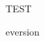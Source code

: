 \documentclass{ltxdoc}
\begin{document}
\maketitle
{}\relax TEST 
\fi

\csname eversion\endcsname
\manifest
\end{document}
